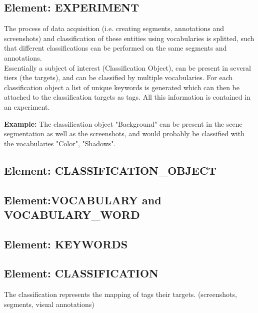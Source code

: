 \documentclass[11pt, a4paper,oneside,chapterprefix=false]{scrbook}
\begin{document}
\newpage
\subsection{Element: EXPERIMENT}
The process of data acquisition (i.e. creating segments, annotations and screenshots) and classification of these entities using vocabularies is splitted, such that different classifications can be performed on the same segments and annotations. \\ 
Essentially a subject of interest (Classification Object), can be present in several tiers (the targets), and can be classified by multiple vocabularies. For each classification object a list of unique keywords is generated which can then be attached to the classification targets as tags. All this information is contained in an experiment.\\

\centering
\begin{minipage}{0.8\textwidth}
\textbf{Example:}
	The classification object "Background" can be present in the scene segmentation as well as the screenshots, 
	and would probably be classified with the vocabularies "Color", "Shadows". 
\end{minipage}


\subsection{Element: CLASSIFICATION\_OBJECT}


\subsection{Element:VOCABULARY and VOCABULARY\_WORD}


\subsection{Element: KEYWORDS}


\subsection{Element: CLASSIFICATION}
The classification represents the mapping of tags their targets. (screenshots, segments, visual annotations) 

\newpage
\end{document}
